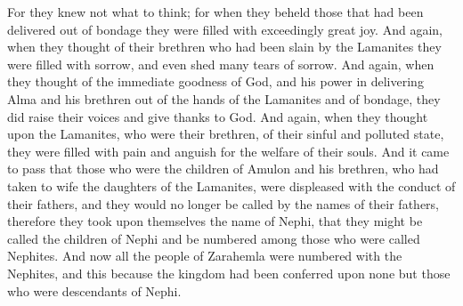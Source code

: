 For they knew not what to think; for when they beheld those that had been delivered out of bondage they were filled with exceedingly great joy.
\bverse \iffalse And again, when they thought of their brethren who had been slain by the Lamanites they were filled with sorrow, and even shed many tears of sorrow. \fi
And again, when they thought of their brethren who had been slain by the Lamanites they were filled with sorrow, and even shed many tears of sorrow.
\bverse \iffalse And again, when they thought of the immediate goodness of God, and his power in delivering Alma and his brethren out of the hands of the Lamanites and of bondage, they did raise their voices and give thanks to God. \fi
And again, when they thought of the immediate goodness of God, and his power in delivering Alma and his brethren out of the hands of the Lamanites and of bondage, they did raise their voices and give thanks to God.
\bverse \iffalse And again, when they thought upon the Lamanites, who were their brethren, of their sinful and polluted state, they were filled with pain and anguish for the welfare of their souls. \fi
And again, when they thought upon the Lamanites, who were their brethren, of their sinful and polluted state, they were filled with pain and anguish for the welfare of their souls.
\bverse \iffalse And it came to pass that those who were the children of Amulon and his brethren, who had taken to wife the daughters of the Lamanites, were displeased with the conduct of their fathers, and they would no longer be called by the names of their fathers, therefore they took upon themselves the name of Nephi, that they might be called the children of Nephi and be numbered among those who were called Nephites. \fi
And it came to pass that those who were the children of Amulon and his brethren, who had taken to wife the daughters of the Lamanites, were displeased with the conduct of their fathers, and they would no longer be called by the names of their fathers, therefore they took upon themselves the name of Nephi, that they might be called the children of Nephi and be numbered among those who were called Nephites.
\bverse \iffalse And now all the people of Zarahemla were numbered with the Nephites, and this because the kingdom had been conferred upon none but those who were descendants of Nephi. \fi
And now all the people of Zarahemla were numbered with the Nephites, and this because the kingdom had been conferred upon none but those who were descendants of Nephi.
\bverse \iffalse And now it came to pass that when Mosiah had made an end of speaking and reading to the people, he desired that Alma should also speak to the people. \fi
